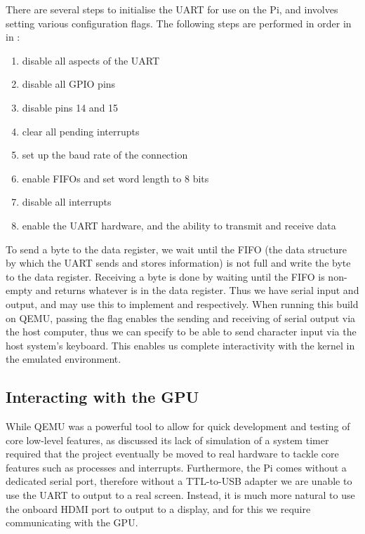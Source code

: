         There are several steps to initialise the UART for use on the Pi, and
        involves setting various configuration flags. The following steps are
        performed in order in  in :
        \begin{enumerate}
            \itemsep0em
            \item disable all aspects of the UART
            \item disable all GPIO pins
            \item disable pins 14 and 15
            \item clear all pending interrupts
            \item set up the baud rate of the connection
            \item enable FIFOs and set word length to 8 bits
            \item disable all interrupts
            \item enable the UART hardware, and the ability to transmit and
                receive data
        \end{enumerate}

        To send a byte to the data register, we wait until the FIFO (the data
        structure by which the UART sends and stores information) is not full
        and write the byte to the data register. Receiving a byte is done by
        waiting until the FIFO is non-empty and returns whatever is in the data
        register. Thus we have serial input and output, and may use this to
        implement  and  respectively. When running this
        build on QEMU, passing the  flag enables the sending and
        receiving of serial output via the host computer, thus we can specify
         to be able to send character input via the host system's
        keyboard. This enables us complete interactivity with the kernel in the
        emulated environment.

\subsection{Interacting with the GPU}
    While QEMU was a powerful tool to allow for quick development and
    testing of core low-level features, as discussed its lack of simulation
    of a system timer required that the project eventually be moved to real
    hardware to tackle core features such as processes and interrupts.
    Furthermore, the Pi comes without a dedicated serial port, therefore without
    a TTL-to-USB adapter we are unable to use the UART to output to a real
    screen. Instead, it is much more natural to use the onboard HDMI port to
    output to a display, and for this we require communicating with the GPU.

